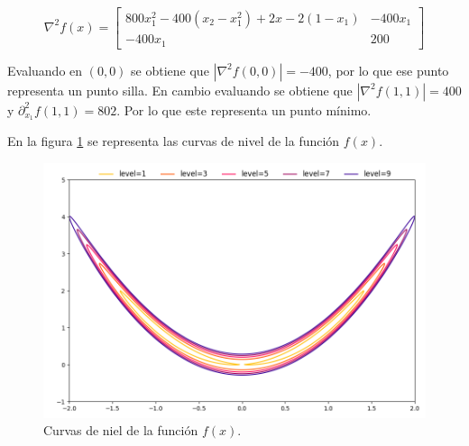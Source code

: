 \begin{equation*}
    \nabla^2f(x) = \begin{bmatrix}
        800x_1^2 -400(x_2-x_1^2)+2x-2(1-x_1) & -400x_1 \\
        -400x_1                              & 200
    \end{bmatrix}
\end{equation*}

Evaluando en $(0,0)$ se obtiene que $|\nabla^2 f(0,0)|=-400$, por lo que ese punto representa un punto silla. En cambio evaluando se obtiene que $|\nabla^2 f(1,1)|=400$ y $\partial^2_{x_1}f(1,1)=802$. Por lo que este representa un punto mínimo.

En la figura \ref{fig:problem_6} se representa las curvas de nivel de la función $f(x)$.

\begin{figure}[H]
    \centering
    \includegraphics[width=12cm]{Graphics/problem06.png}
    \caption{Curvas de niel de la función $f(x)$.}
    \label{fig:problem_6}
\end{figure}